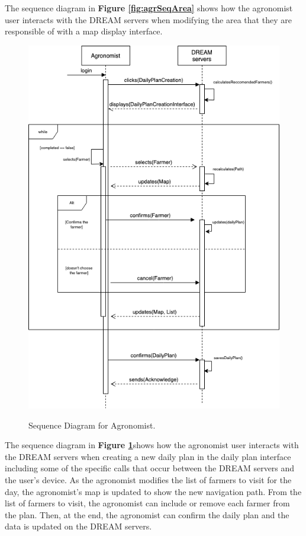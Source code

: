 \begin{flushleft}
The sequence diagram in \textbf{Figure \ref{fig:agrSeqArea}} shows how the agronomist user interacts with the DREAM servers when modifying the area that they are responsible of with a map display interface.
\end{flushleft}


\begin{figure}[hpt!]
\centering
\includegraphics[scale=0.5]{Files/sequence_disgrams/thePNGs/agronomist_createPlan.png}\\
\caption{\label{fig:agrSeqCreatePlan}Sequence Diagram for Agronomist.}
\end{figure}
\begin{flushleft}
The sequence diagram in \textbf{Figure \ref{fig:agrSeqCreatePlan}}shows how the agronomist user interacts with the DREAM servers when creating a new daily plan in the daily plan interface including some of the specific calls that occur between the DREAM servers and the user's device. As the agronomist modifies the list of farmers to visit for the day, the agronomist's map is updated to show the new navigation path. From the list of farmers to visit, the agronomist can include or remove each farmer from the plan. Then, at the end, the agronomist can confirm the daily plan and the data is updated on the DREAM servers.
\end{flushleft}

